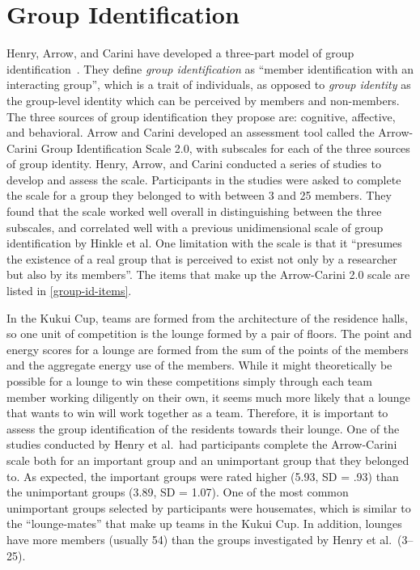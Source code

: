 \section{Group Identification}

Henry, Arrow, and Carini have developed a three-part model of group identification~\cite{Henry1999}. They define \emph{group identification} as ``member identification with an interacting group'', which is a trait of individuals, as opposed to \emph{group identity} as the group-level identity which can be perceived by members and non-members. The three sources of group identification they propose are: cognitive, affective, and behavioral. Arrow and Carini developed an assessment tool called the Arrow-Carini Group Identification Scale 2.0, with subscales for each of the three sources of group identity. Henry, Arrow, and Carini conducted a series of studies to develop and assess the scale. Participants in the studies were asked to complete the scale for a group they belonged to with between 3 and 25 members. They found that the scale worked well overall in distinguishing between the three subscales, and correlated well with a previous unidimensional scale of group identification by Hinkle et al. One limitation with the scale is that it ``presumes the existence of a real group that is perceived to exist not only by a researcher but also by its members''. The items that make up the Arrow-Carini 2.0 scale are listed in \autoref{group-id-items}.

In the Kukui Cup, teams are formed from the architecture of the residence halls, so one unit of competition is the lounge formed by a pair of floors. The point and energy scores for a lounge are formed from the sum of the points of the members and the aggregate energy use of the members. While it might theoretically be possible for a lounge to win these competitions simply through each team member working diligently on their own, it seems much more likely that a lounge that wants to win will work together as a team. Therefore, it is important to assess the group identification of the residents towards their lounge. One of the studies conducted by Henry et al.\ had participants complete the Arrow-Carini scale both for an important group and an unimportant group that they belonged to. As expected, the important groups were rated higher (5.93, SD = .93) than the unimportant groups (3.89, SD = 1.07). One of the most common unimportant groups selected by participants were housemates, which is similar to the ``lounge-mates'' that make up teams in the Kukui Cup. In addition, lounges have more members (usually 54) than the groups investigated by Henry et al.\ (3--25).


